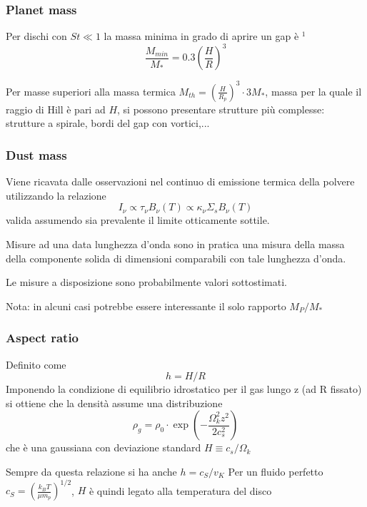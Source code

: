 \documentclass[DIN, pagenumber=false, fontsize=11pt, parskip=half]{scrartcl}
\begin{document}
\subsubsection{Planet mass}
\label{mp}
Per dischi con $St \ll 1$ la massa minima in grado di aprire un gap è \hyperref[source]{$^1$} 
\begin{equation}
 \frac{M_{min}}{M_*} = 0.3 \left(\frac HR \right)^3
\end{equation}

Per masse superiori alla massa termica $M_{th} = \left(\frac {H}{ R_p} \right)^3\cdot 3M_*$, massa per la quale il raggio di Hill è pari ad $H$, si possono presentare strutture più complesse: strutture a spirale, bordi del gap con vortici,...

\subsubsection{Dust mass}
\label{dustmass}
Viene ricavata dalle osservazioni nel continuo di emissione termica della polvere utilizzando la relazione
\begin{equation}
 I_\nu \propto \tau_\nu B_\nu(T) \propto \kappa_\nu \Sigma_s B_\nu(T)
\end{equation}
valida assumendo sia prevalente il limite otticamente sottile.

Misure ad una data lunghezza d'onda sono in pratica una misura della massa della componente solida di dimensioni comparabili con tale lunghezza d'onda.

Le misure a disposizione sono probabilmente valori sottostimati.

Nota: in alcuni casi potrebbe essere interessante il solo rapporto $M_P/M_*$ 
\subsubsection{Aspect ratio}
\label{aspectratio}
Definito come
\begin{equation}
h =H/R
\end{equation}
Imponendo la condizione di equilibrio idrostatico per il gas lungo z (ad R fissato) si ottiene che la densità assume una distribuzione
\begin{equation}
\rho_g = \rho_0 \cdot \exp(-\frac{\Omega_k^2z^2}{2c_s^2})
\end{equation}
che è una gaussiana con deviazione standard $H \equiv c_s/\Omega_k$

Sempre da questa relazione si ha anche $h = c_S/v_K$
Per un fluido perfetto $c_S=(\frac{k_BT}{\mu m_p})^{1/2}$, $H$ è quindi legato alla temperatura del disco
\end{document}
